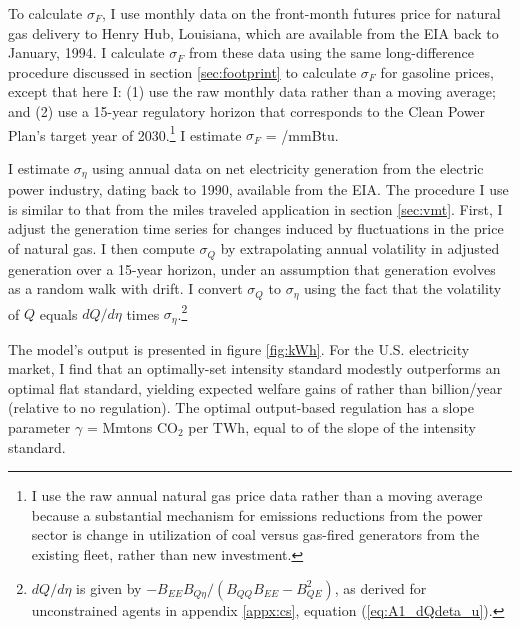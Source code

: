\documentclass[12pt]{article}
\begin{document}
To calculate $\sigma_F$, I use monthly data on the front-month futures price for natural gas delivery to Henry Hub, Louisiana, which are available from the EIA back to January, 1994. I calculate $\sigma_F$ from these data using the same long-difference procedure discussed in section \ref{sec:footprint} to calculate $\sigma_F$ for gasoline prices, except that here I: (1) use the raw monthly data rather than a moving average; and (2) use a 15-year regulatory horizon that corresponds to the Clean Power Plan's target year of 2030.\footnote{I use the raw annual natural gas price data rather than a moving average because a substantial mechanism for emissions reductions from the power sector is change in utilization of coal versus gas-fired generators from the existing fleet, rather than new investment.} I estimate $\sigma_F$ = \unskip/mmBtu.

I estimate $\sigma_\eta$ using annual data on net electricity generation from the electric power industry, dating back to 1990, available from the EIA. The procedure I use is similar to that from the miles traveled application in section \ref{sec:vmt}. First, I adjust the generation time series for changes induced by fluctuations in the price of natural gas. I then compute $\sigma_Q$ by extrapolating annual volatility in adjusted generation over a 15-year horizon, under an assumption that generation evolves as a random walk with drift. I convert $\sigma_Q$ to $\sigma_\eta$ using the fact that the volatility of $Q$ equals $dQ/d\eta$ times $\sigma_\eta$.\footnote{$dQ/d\eta$ is given by $-B_{EE}B_{Q\eta}/(B_{QQ}B_{EE}-B_{QE}^2)$, as derived for unconstrained agents in appendix \ref{appx:cs}, equation (\ref{eq:A1_dQdeta_u}).} 

The model's output is presented in figure \ref{fig:kWh}. For the U.S. electricity market, I find that an optimally-set intensity standard modestly outperforms an optimal flat standard, yielding expected welfare gains of rather than billion/year (relative to no regulation). The optimal output-based regulation has a slope parameter $\gamma$ = Mmtons CO$_2$ per TWh, equal to of the slope of the intensity standard.
\end{document}
